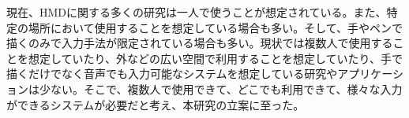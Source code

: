 \documentclass[technicalreport]{ieicej}
\begin{document}
現在、HMDに関する多くの研究は一人で使うことが想定されている。また、特定の場所において使用することを想定している場合も多い。そして、手やペンで描くのみで入力手法が限定されている場合も多い。現状では複数人で使用することを想定していたり、外などの広い空間で利用することを想定していたり、手で描くだけでなく音声でも入力可能なシステムを想定している研究やアプリケーションは少ない。そこで、複数人で使用できて、どこでも利用できて、様々な入力ができるシステムが必要だと考え、本研究の立案に至った。


%
%
\begin{thebibliography}{99}%
\bibitem{}
\end{thebibliography}
\end{document}
